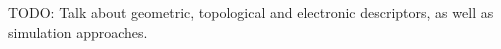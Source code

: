 TODO: Talk about geometric, topological and electronic descriptors, as well as simulation approaches.